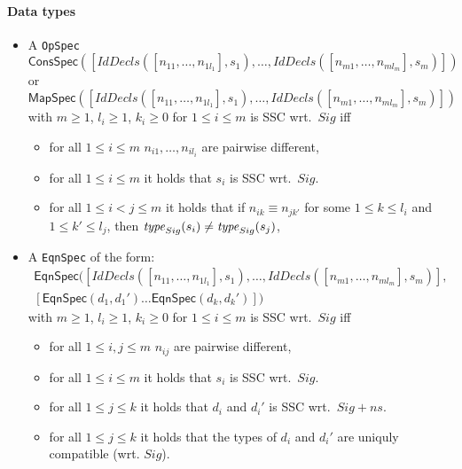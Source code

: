 \documentclass[fleqn,a4paper,dvips]{article}
\newcommand{\aterm}[1]{\mathsf{#1}}
\begin{document}
\paragraph{Data types}
\begin{itemize}
\item
  A {\tt OpSpec}\\
  $\aterm{ConsSpec}([IdDecls([n_{11},\dots,n_{1l_1}],s_1),\dots,IdDecls([n_{m1},\dots,n_{ml_m}],s_m)])$
  or\\
  $\aterm{MapSpec}([IdDecls([n_{11},\dots,n_{1l_1}],s_1),\dots,IdDecls([n_{m1},\dots,n_{ml_m}],s_m)])$
  with $m\geq 1$, $l_i\geq 1$, $k_i\geq 0$ for $1\leq i\leq m$
  is SSC wrt.\ $Sig$ iff
  \begin{itemize}
  \item
    for all $1\leq i\leq m$  $n_{i1},\ldots,n_{il_i}$ are
    pairwise different,
  \item
    for all $1\leq i\leq m$ it holds that $s_i$ is SSC wrt.\ $Sig$.
  \item
    for all $1\leq i<j\leq m$ it holds that
    if $n_{ik}\equiv n_{jk'}$ for some $1\leq k\leq l_i$ and $1\leq
    k'\leq l_j$, then $\mathit{type}_{Sig}(s_i)\neq\mathit{type}_{Sig}(s_j)$,
  \end{itemize}
\item
  A {\tt EqnSpec} of the form:\\
\begin{gather}
  \aterm{EqnSpec}([IdDecls([n_{11},\ldots,n_{1l_1}],s_1),\dots,IdDecls([n_{m1},\ldots,n_{ml_m}],s_m)],\\
  [\aterm{EqnSpec}(d_1,d_1')\dots\aterm{EqnSpec}(d_k,d_k')])
\end{gather}
  with $m\geq 1$, $l_i\geq 1$, $k_i\geq 0$ for $1\leq i\leq m$
  is SSC wrt.\ $Sig$ iff
  \begin{itemize}
  \item
    for all $1\leq i,j\leq m$  $n_{ij}$ are pairwise different,
  \item
    for all $1\leq i\leq m$ it holds that $s_i$ is SSC wrt.\ $Sig$.
  \item
    for all $1\leq j\leq k$ it holds that $d_i$ and $d_i'$ is SSC wrt.\ $Sig+ns$.
  \item
    for all $1\leq j\leq k$ it holds that the types of $d_i$ and $d_i'$ are uniquly compatible (wrt. $Sig$).
  \end{itemize}
\end{itemize}
\end{document}

